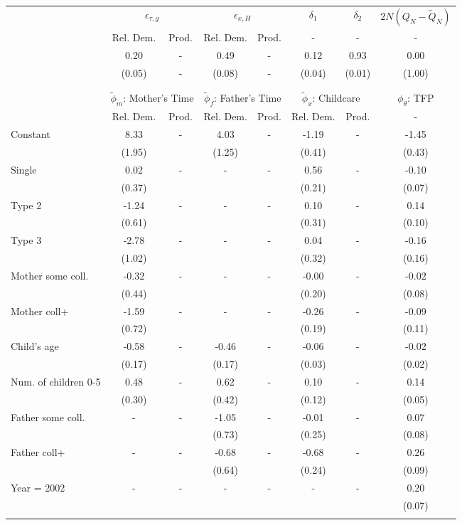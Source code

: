 \begin{tabular}{lccccccc}\toprule
 & \multicolumn{2}{c}{$\epsilon_{\tau,g}$} & \multicolumn{2}{c}{$\epsilon_{x,H}$} & {$\delta_{1}$} & {$\delta_{2}$} & $2N(Q_{N} - \tilde{Q}_{N})$ \\
 & Rel. Dem. & Prod. & Rel. Dem. & Prod. & - & - & - \\\cmidrule(r){2-3}\cmidrule(r){4-5}\cmidrule(r){6-6}\cmidrule(r){7-7}\cmidrule(r){8-8}
&0.20& - &0.49& - &0.12&0.93&0.00\\
&(0.05)& - &(0.08)& - &(0.04)&(0.01)&(1.00)\\
\\
&&&&&&&\\
 & \multicolumn{2}{c}{$\tilde{\phi}_{m}$: Mother's Time} & \multicolumn{2}{c}{$\tilde{\phi}_{f}$: Father's Time} & \multicolumn{2}{c}{$\tilde{\phi}_{x}$: Childcare} &{$\phi_{\theta}$: TFP} \\
 & Rel. Dem. & Prod. & Rel. Dem. & Prod. & Rel. Dem. & Prod. & -  \\\cmidrule(r){2-3}\cmidrule(r){4-5}\cmidrule(r){6-7}\cmidrule(r){8-8}
Constant&8.33& -&4.03& -&-1.19& -&-1.45\\
&(1.95)&&(1.25)&&(0.41)&&(0.43)\\
Single&0.02& -& - & -&0.56& -&-0.10\\
&(0.37)& & &&(0.21)&&(0.07)\\
Type 2&-1.24& -& - & -&0.10& -&0.14\\
&(0.61)& & &&(0.31)&&(0.10)\\
Type 3&-2.78& -& - & -&0.04& -&-0.16\\
&(1.02)& & &&(0.32)&&(0.16)\\
Mother some coll.&-0.32& -& - & -&-0.00& -&-0.02\\
&(0.44)& & &&(0.20)&&(0.08)\\
Mother coll+&-1.59& -& - & -&-0.26& -&-0.09\\
&(0.72)& & &&(0.19)&&(0.11)\\
Child's age&-0.58& -&-0.46& -&-0.06& -&-0.02\\
&(0.17)&&(0.17)&&(0.03)&&(0.02)\\
Num. of children 0-5&0.48& -&0.62& -&0.10& -&0.14\\
&(0.30)&&(0.42)&&(0.12)&&(0.05)\\
Father some coll.& - & -&-1.05& -&-0.01& -&0.07\\
 & &&(0.73)&&(0.25)&&(0.08)\\
Father coll+& - & -&-0.68& -&-0.68& -&0.26\\
 & &&(0.64)&&(0.24)&&(0.09)\\
Year = 2002& - & -& - & -& - & -&0.20\\
 & & & & & &&(0.07)\\
\\
\bottomrule\end{tabular}